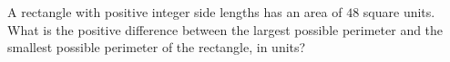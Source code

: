 A rectangle with positive integer side lengths has an area of $48$ square units. What is the positive difference between the largest possible perimeter and the smallest possible perimeter of the rectangle, in units?
